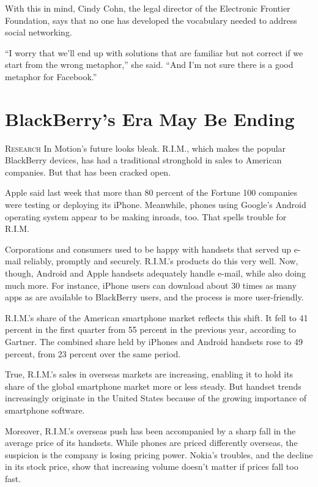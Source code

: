 ﻿\documentclass[12pt]{article}
\begin{document}
With this in mind, Cindy Cohn, the legal director of the Electronic Frontier Foundation, says that
no one has developed the vocabulary needed to address social networking.

``I worry that we'll end up with solutions that are familiar but not correct if we start from the
wrong metaphor,'' she said. ``And I'm not sure there is a good metaphor for Facebook.''

\section{BlackBerry's Era May Be Ending}

\lettrine{R}{esearch} In Motion's future looks bleak. R.I.M., which makes
the popular BlackBerry devices, has had a traditional stronghold in sales to American companies. But
that has been cracked open.

Apple said last week that more than 80 percent of the Fortune 100 companies were testing or
deploying its iPhone. Meanwhile, phones using Google's Android operating system appear to be making
inroads, too. That spells trouble for R.I.M.

Corporations and consumers used to be happy with handsets that served up e-mail reliably, promptly
and securely. R.I.M.'s products do this very well. Now, though, Android and Apple handsets
adequately handle e-mail, while also doing much more. For instance, iPhone users can download about
30 times as many apps as are available to BlackBerry users, and the process is more user-friendly.

R.I.M.'s share of the American smartphone market reflects this shift. It fell to 41 percent in the
first quarter from 55 percent in the previous year, according to Gartner. The combined share held by
iPhones and Android handsets rose to 49 percent, from 23 percent over the same period.

True, R.I.M.'s sales in overseas markets are increasing, enabling it to hold its share of the global
smartphone market more or less steady. But handset trends increasingly originate in the United
States because of the growing importance of smartphone software.

Moreover, R.I.M.'s overseas push has been accompanied by a sharp fall in the average price of its
handsets. While phones are priced differently overseas, the suspicion is the company is losing
pricing power. Nokia's troubles, and the decline in its stock price, show that increasing volume
doesn't matter if prices fall too fast.
\end{document}
